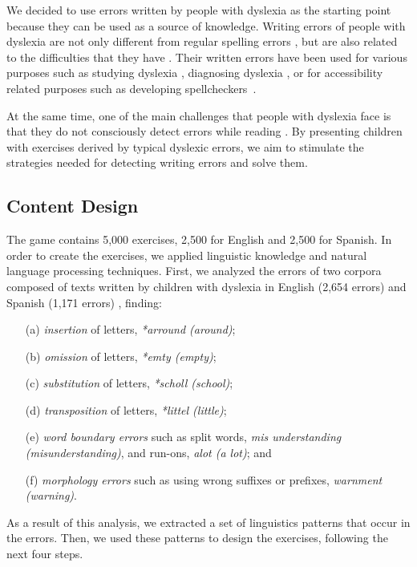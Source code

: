 \documentclass[letterpaper]{sig-alternate-2013}
\begin{document}
We decided to use errors written by people with dyslexia as the starting point because they can be used as a source of knowledge. Writing errors of people with dyslexia are not only different from regular spelling errors \cite{Pedler2007}, but are also related to the difficulties that they have \cite{Sterling1998}. Their written errors have been used for various purposes such as studying dyslexia \cite{Lindgren2011}, diagnosing dyslexia \cite{TALE1984}, or for accessibility related purposes such as developing spellcheckers~\cite{Pedler2007}. 

At the same time, one of the main challenges that people with dyslexia face is that they do not consciously detect errors while reading \cite{Bruck1988,WWW2012}. By presenting children with exercises derived by typical dyslexic errors, we aim to stimulate the strategies needed for detecting writing errors and solve them.


\subsection{Content Design}
The game contains 5,000 exercises, 2,500 for English and 2,500 for Spanish. In order to create the exercises, we applied linguistic knowledge and natural language processing techniques. First, we analyzed the errors of two corpora composed of texts written by children with dyslexia in English \cite{Pedler2007} (2,654 errors) and Spanish (1,171 errors) \cite{LREC2014}, finding:

\begin{itemize}
\begin{itemize}
\item[(a)] {\it insertion} of letters, \textit{*arround (around)};
\item[(b)] {\it omission} of letters, \textit {*emty (empty)};
\item[(c)] {\it substitution} of letters, \textit{*scholl (school)}; 
\item[(d)] {\it transposition} of letters, \textit {*littel (little)}; 
\item[(e)] {\it word boundary errors} such as split words, {\it *mis understanding (misunderstanding)}, and run-ons, {\it *alot (a lot)}; and
\item[(f)]  {\it morphology errors} such as using wrong suffixes or prefixes, {\it *warnment (warning)}. 
\end{itemize}
\end{itemize}

As a result of this analysis, we extracted a set of linguistics patterns that occur in the errors. Then, we used these patterns to design the exercises, following the next four steps.
\end{document}
